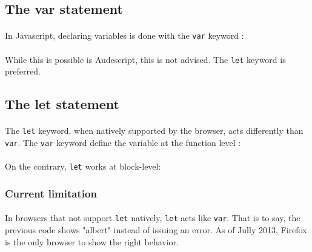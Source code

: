 \documentclass{article}
\begin{document}
\begin{sloppypar}
\subsection{ The var statement}


\paragraph{}
In Javascript, declaring variables is done with the \verb!var! keyword :
      {}

      
\paragraph{}
While this is possible is Audescript, this is not advised. The \verb!let! keyword is preferred.
   
   

\subsection{ The let statement}

{}

      
\paragraph{}
The \verb!let! keyword, when natively supported by the browser, acts differently than \verb!var!. The \verb!var! keyword define the variable at the function level :
      
      {}
 
      
\paragraph{}
On the contrary, \verb!let! works at block-level:
      {}

      

\subsubsection{ Current limitation}


\paragraph{}
In browsers that not support \verb!let! natively, \verb!let! acts like \verb!var!. That is to say, the previous code shows "albert" instead of issuing an error. As of Jully 2013, Firefox is the only browser to show the right behavior.
      

\end{sloppypar}
\end{document}

